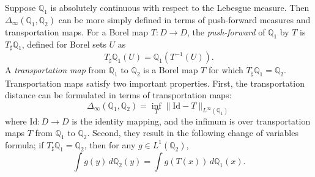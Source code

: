 \documentclass{article}
\newcommand{\1}{\mathbf{1}}
\newcommand{\Leb}{L}
\newcommand{\mbb}[1]{\mathbb{#1}}
\theoremstyle{definition}
\theoremstyle{remark}
\begin{document}
Suppose $\mbb{Q}_1$ is absolutely continuous with respect to the Lebesgue measure. Then $\Delta_{\infty}(\mbb{Q}_1,\mbb{Q}_2)$ can be more simply defined in terms of push-forward measures and transportation maps. For a Borel map $T: D \to D$, the \emph{push-forward} of $\mbb{Q}_1$ by $T$ is $T_{\sharp}\mbb{Q}_1$, defined for Borel sets $U$ as 
\begin{equation*}
T_{\sharp}\mbb{Q}_1(U) = \mbb{Q}_1(T^{-1}(U)).
\end{equation*}
A \emph{transportation map} from $\mbb{Q}_1$ to $\mbb{Q}_2$ is a Borel map $T$ for which $T_{\sharp}\mbb{Q}_1 = \mbb{Q}_2$. Transportation maps satisfy two important properties. First, the transportation distance can be formulated in terms of transportation maps:
\begin{equation*}
\Delta_{\infty}(\mbb{Q}_1,\mbb{Q}_2) = \inf_{T} \|\mathrm{Id} - T\|_{\Leb^{\infty}(\mbb{Q}_1)}
\end{equation*}
where $\mathrm{Id}: D \to D$ is the identity mapping, and the infimum is over transportation maps $T$ from $\mbb{Q}_1$ to $\mbb{Q}_2$. Second, they result in the following change of variables formula; if $T_{\sharp}\mbb{Q}_1 = \mbb{Q}_2$, then for any $g \in L^1(\mbb{Q}_2)$,
\begin{equation}
\label{eqn:transportation_map_change_of_variable}
\int g(y) \,d\mbb{Q}_2(y) = \int g(T(x)) \,d\mbb{Q}_1(x).
\end{equation} 
\end{document}
